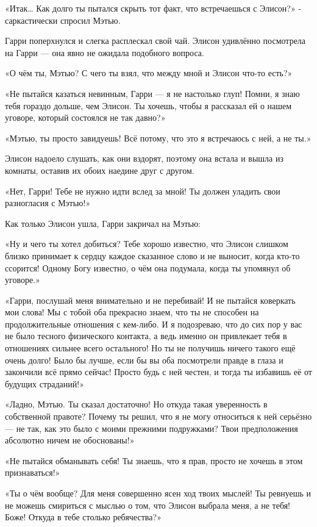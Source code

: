 \documentclass[a4paper,12pt]{book}
\begin{document}
\par
«Итак… Как долго ты пытался скрыть тот факт, что встречаешься с Элисон?» - саркастически спросил Мэтью.
\par
Гарри поперхнулся и слегка расплескал свой чай. Элисон удивлённо посмотрела на Гарри — она явно не ожидала подобного вопроса.
\par
«О чём ты, Мэтью? С чего ты взял, что между мной и Элисон что-то есть?»
\par
«Не пытайся казаться невинным, Гарри — я не настолько глуп! Помни, я знаю тебя гораздо дольше, чем Элисон. Ты хочешь, чтобы я рассказал ей о нашем уговоре, который состоялся не так давно?»
\par
«Мэтью, ты просто завидуешь! Всё потому, что это я встречаюсь с ней, а не ты.»
\par
Элисон надоело слушать, как они вздорят, поэтому она встала и вышла из комнаты, оставив их обоих наедине друг с другом.
\par
«Нет, Гарри! Тебе не нужно идти вслед за мной! Ты должен уладить свои разногласия с Мэтью!»
\par
Как только Элисон ушла, Гарри закричал на Мэтью:
\par
«Ну и чего ты хотел добиться? Тебе хорошо известно, что Элисон слишком близко принимает к сердцу каждое сказанное слово и не выносит, когда кто-то ссорится! Одному Богу известно, о чём она подумала, когда ты упомянул об уговоре.»
\par
«Гарри, послушай меня внимательно и не перебивай! И не пытайся коверкать мои слова! Мы с тобой оба прекрасно знаем, что ты не способен на продолжительные отношения с кем-либо. И я подозреваю, что до сих пор у вас не было тесного физического контакта, а ведь именно он привлекает тебя в отношениях сильнее всего остального! Но ты не получишь ничего такого ещё очень долго! Было бы лучше, если бы вы оба посмотрели правде в глаза и закончили всё прямо сейчас! Просто будь с ней честен, и тогда ты избавишь её от будущих страданий!»
\par
«Ладно, Мэтью. Ты сказал достаточно! Но откуда такая уверенность в собственной правоте? Почему ты решил, что я не могу относиться к ней серьёзно — не так, как это было с моими прежними подружками? Твои предположения абсолютно ничем не обоснованы!»
\par
«Не пытайся обманывать себя! Ты знаешь, что я прав, просто не хочешь в этом признаваться!»
\par
«Ты о чём вообще? Для меня совершенно ясен ход твоих мыслей! Ты ревнуешь и не можешь смириться с мыслью о том, что Элисон выбрала меня, а не тебя! Боже! Откуда в тебе столько ребячества?»
\end{document}
